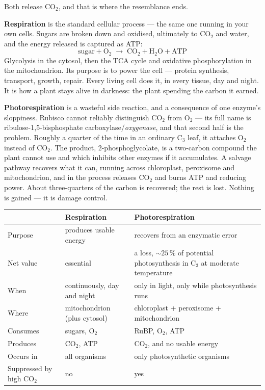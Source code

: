 \documentclass[11pt,letterpaper]{article}
\begin{document}
Both release CO$_2$, and that is where the resemblance ends.

\textbf{Respiration} is the standard cellular process --- the same one running
in your own cells. Sugars are broken down and oxidised, ultimately to CO$_2$ and
water, and the energy released is captured as ATP:
\[
\text{sugar} + \mathrm{O_2} \;\longrightarrow\; \mathrm{CO_2} + \mathrm{H_2O} + \text{ATP}
\]
Glycolysis in the cytosol, then the TCA cycle and oxidative phosphorylation in
the mitochondrion. Its purpose is to power the cell --- protein synthesis,
transport, growth, repair. Every living cell does it, in every tissue, day and
night. It is how a plant stays alive in darkness: the plant spending the carbon
it earned.

\textbf{Photorespiration} is a wasteful side reaction, and a consequence of one
enzyme's sloppiness. Rubisco cannot reliably distinguish CO$_2$ from O$_2$ ---
its full name is ribulose-1,5-bisphosphate carboxylase/\emph{oxygenase}, and
that second half is the problem. Roughly a quarter of the time in an ordinary
C$_3$ leaf, it attaches O$_2$ instead of CO$_2$. The product,
2-phosphoglycolate, is a two-carbon compound the plant cannot use and which
inhibits other enzymes if it accumulates. A salvage pathway recovers what it
can, running across chloroplast, peroxisome and mitochondrion, and in the
process releases CO$_2$ and burns ATP and reducing power. About three-quarters
of the carbon is recovered; the rest is lost. Nothing is gained --- it is damage
control.

\begin{center}
\small
\begin{tabularx}{\textwidth}{@{}lXX@{}}
\toprule
& \textbf{Respiration} & \textbf{Photorespiration}\\
\midrule
Purpose & produces usable energy & recovers from an enzymatic error\\
Net value & essential & a loss, ${\sim}25\,\%$ of potential photosynthesis in C$_3$ at moderate temperature\\
When & continuously, day and night & only in light, only while photosynthesis runs\\
Where & mitochondrion (plus cytosol) & chloroplast + peroxisome + mitochondrion\\
Consumes & sugars, O$_2$ & RuBP, O$_2$, ATP\\
Produces & CO$_2$, ATP & CO$_2$, and no usable energy\\
Occurs in & all organisms & only photosynthetic organisms\\
Suppressed by high CO$_2$ & no & yes\\
\bottomrule
\end{tabularx}
\end{center}
\end{document}
